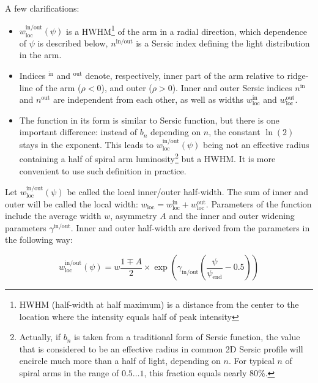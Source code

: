 \documentclass[12pt,a4paper]{article}
\begin{document}
A few clarifications:
\begin{itemize}
	\item $w_\text{loc}^\text{in/out}(\psi)$ is a HWHM\footnote{HWHM (half-width at half maximum) is a distance from the center to the location where the intensity equals half of peak intensity} of the arm in a radial direction, which dependence of $\psi$ is described below, $n^\text{in/out}$ is a Sersic index defining the light distribution in the arm.
	\item
	Indices $^\text{in}$ and $^\text{out}$ denote, respectively, inner part of the arm relative to ridge-line of the arm ($\rho < 0$), and outer ($\rho > 0$). Inner and outer Sersic indices $n^\text{in}$ and $n^\text{out}$ are independent from each other, as well as widths $w_\text{loc}^\text{in}$ and $w_\text{loc}^\text{out}$.
	\item The function in its form is similar to Sersic function, but there is one important difference: instead of $b_n$ depending on $n$, the constant $\ln(2)$ stays in the exponent. This leads to $w_\text{loc}^\text{in/out}(\psi)$ being not an effective radius containing a half of spiral arm luminosity\footnote{Actually, if $b_n$ is taken from a traditional form of Sersic function, the value that is considered to be an effective radius in common 2D Sersic profile will encircle much more than a half of light, depending on $n$. For typical $n$ of spiral arms in the range of $0.5 \ldots 1$, this fraction equals nearly 80\%.} but a HWHM. It is more convenient to use such definition in practice.
\end{itemize}

Let $w_\text{loc}^\text{in/out}(\psi)$ be called the local inner/outer half-width. The sum of inner and outer will be called the local width: $w_\text{loc} = w_\text{loc}^\text{in} + w_\text{loc}^\text{out}$. Parameters of the function include the average width $w$, asymmetry $A$ and the inner and outer widening parameters $\gamma^\text{in/out}$. Inner and outer half-width are derived from the parameters in the following way:

\begin{equation}
	w_\text{loc}^\text{in/out}(\psi) = w \frac{1 \mp A}{2} \times \exp\left(\gamma_\text{in/out} \left(\frac{\psi}{\psi_\text{end}} - 0.5\right)\right)
\end{equation}
\end{document}
